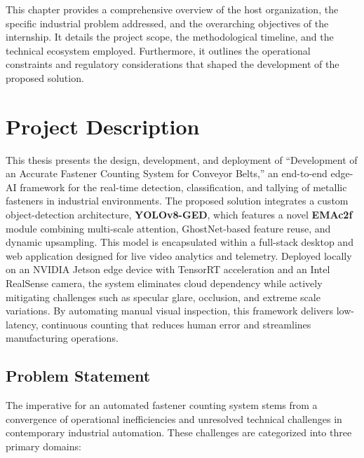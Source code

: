 \label{ch:introduction}

This chapter provides a comprehensive overview of the host organization, the specific industrial problem addressed, and the overarching objectives of the internship. It details the project scope, the methodological timeline, and the technical ecosystem employed. Furthermore, it outlines the operational constraints and regulatory considerations that shaped the development of the proposed solution.

\section{Project Description} 
\label{sec:project_description}

This thesis presents the design, development, and deployment of ``Development of an Accurate Fastener Counting System for Conveyor Belts,'' an end-to-end edge-AI framework for the real-time detection, classification, and tallying of metallic fasteners in industrial environments. The proposed solution integrates a custom object-detection architecture, \textbf{YOLOv8-GED}, which features a novel \textbf{EMAc2f} module combining multi-scale attention, GhostNet-based feature reuse, and dynamic upsampling. This model is encapsulated within a full-stack desktop and web application designed for live video analytics and telemetry. Deployed locally on an NVIDIA Jetson edge device with TensorRT acceleration and an Intel RealSense camera, the system eliminates cloud dependency while actively mitigating challenges such as specular glare, occlusion, and extreme scale variations. By automating manual visual inspection, this framework delivers low-latency, continuous counting that reduces human error and streamlines manufacturing operations.

\subsection{Problem Statement}
\label{sec:problem_statement}

The imperative for an automated fastener counting system stems from a convergence of operational inefficiencies and unresolved technical challenges in contemporary industrial automation. These challenges are categorized into three primary domains:

